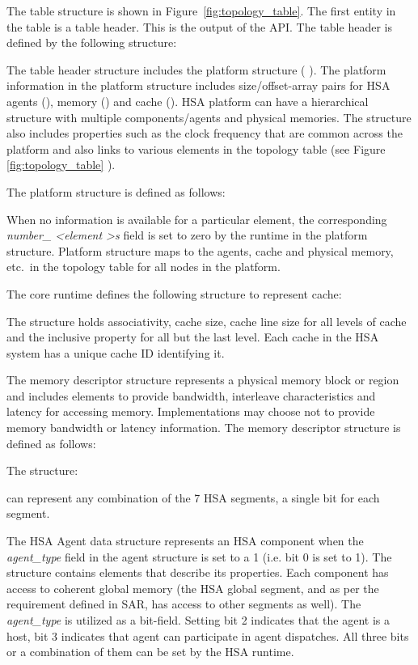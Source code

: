 The table structure is shown in Figure~\ref{fig:topology_table}.
The first entity in the table is a table header. This is the output
of the  API.
The table header is defined by the following structure:


The table header structure includes the platform structure (
).  The platform information in the platform
structure includes size/offset-array pairs for HSA agents
(), memory () and
cache ().  
HSA platform can have a hierarchical structure with multiple
components/agents and physical memories.  The
 structure also includes properties such as
the clock frequency that are common across the platform and also
links to various elements in the topology table (see Figure
\ref{fig:topology_table} ).

The platform structure is defined as follows:



When no information is available for a particular element, the
corresponding {\itshape number\_ \textless element \textgreater s}
field is set to zero by the runtime in the platform structure.
Platform structure maps to the agents, cache and physical memory,
etc.\, in the topology table for all nodes in the platform. 

The core runtime defines the following structure to represent cache:

The structure holds associativity, cache size, cache line size for
all levels of cache and the inclusive property for all but the
last level. Each cache in the HSA system has a unique cache ID
identifying it.

The memory descriptor structure represents a physical memory block
or region and includes elements to provide bandwidth, interleave
characteristics and latency for accessing memory. Implementations
may choose not to provide memory bandwidth or latency information.
The memory descriptor structure is defined as follows:

 

The structure: 
 
can represent any combination of the 7 HSA segments, a single
bit for each segment. 

The HSA Agent data structure represents an HSA component when the
{\itshape agent\_type} field in the agent structure is set to a 1
(i.e. bit 0 is set to 1).
The structure contains elements that describe its properties. Each
component has access to coherent global memory (the HSA global
segment, and as per the requirement defined in SAR, has access to
other segments as well). The {\itshape agent\_type} is utilized as a
bit-field. Setting bit 2 indicates that the agent is a host, bit 3
indicates that agent can participate in agent dispatches. All
three bits or a combination of them can be set by the HSA runtime.

